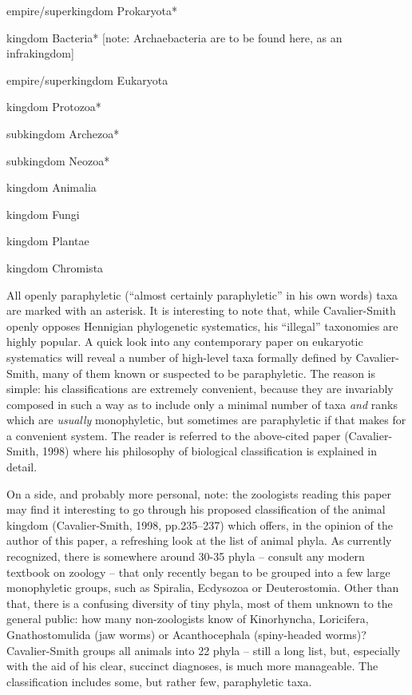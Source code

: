 \begin{artengenv}
\begin{longitemize}
\item empire/superkingdom Prokaryota*
\begin{longitemize}
\item kingdom Bacteria* [note: Archaebacteria are to be found here, as an infrakingdom]
\end{longitemize}
\item empire/superkingdom Eukaryota
\begin{longitemize}
\item kingdom Protozoa*
\begin{longitemize}
\item subkingdom Archezoa*
\item subkingdom Neozoa*
\end{longitemize}
\item kingdom Animalia
\item kingdom Fungi
\item kingdom Plantae
\item kingdom Chromista
\end{longitemize}
\end{longitemize}
All openly paraphyletic (“almost certainly paraphyletic” in his own words) taxa are marked with an asterisk. It is
interesting to note that, while Cavalier-Smith openly opposes Hennigian phylogenetic systematics, his “illegal”
taxonomies are highly popular. A quick look into any contemporary paper on eukaryotic systematics will reveal a number
of high-level taxa formally defined by Cavalier-Smith, many of them known or suspected to be paraphyletic. The reason
is simple: his classifications are extremely convenient, because they are invariably composed in such a way as to
include only a minimal number of taxa \textit{and} ranks which are \textit{usually }monophyletic, but sometimes are
paraphyletic if that makes for a convenient system. The reader is referred to the above-cited paper (Cavalier-Smith,
1998) where his philosophy of biological classification is explained in detail.

On a side, and probably more personal, note: the zoologists reading this paper may find it interesting to go through his
proposed classification of the animal kingdom \label{ref:RNDayLTgHPurs}(Cavalier-Smith, 1998, pp.235–237) which offers,
in the opinion of the author of this paper, a refreshing look at the list of animal phyla. As currently recognized,
there is somewhere around 30-35 phyla – consult any modern textbook on zoology – that only recently began to be grouped
into a few large monophyletic groups, such as Spiralia, Ecdysozoa or Deuterostomia. Other than that, there is a
confusing diversity of tiny phyla, most of them unknown to the general public: how many non-zoologists know of
Kinorhyncha, Loricifera, Gnathostomulida (jaw worms) or Acanthocephala (spiny-headed worms)? Cavalier-Smith groups all
animals into 22 phyla – still a long list, but, especially with the aid of his clear, succinct diagnoses, is much more
manageable. The classification includes some, but rather few, paraphyletic taxa.


\end{artengenv}

